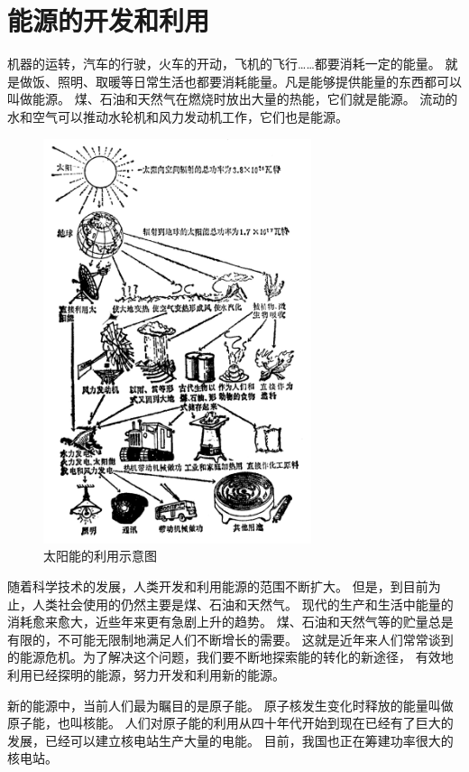 \section{能源的开发和利用}\label{sec:5-7}

机器的运转，汽车的行驶，火车的开动，飞机的飞行……都要消耗一定的能量。
就是做饭、照明、取暖等日常生活也都要消耗能量。凡是能够提供能量的东西都可以叫做能源。
煤、石油和天然气在燃烧时放出大量的热能，它们就是能源。
流动的水和空气可以推动水轮机和风力发动机工作，它们也是能源。

\begin{figure}[htbp]
    \centering
    \includegraphics[width=0.7\textwidth]{../pic/czwl2-ch5-7}
    \caption{太阳能的利用示意图}\label{fig:5-7}
\end{figure}

随着科学技术的发展，人类开发和利用能源的范围不断扩大。
但是，到目前为止，人类社会使用的仍然主要是煤、石油和天然气。
现代的生产和生活中能量的消耗愈来愈大，近些年来更有急剧上升的趋势。
煤、石油和天然气等的贮量总是有限的，不可能无限制地满足人们不断增长的需要。
这就是近年来人们常常谈到的能源危机。为了解决这个问题，我们要不断地探索能的转化的新途径，
有效地利用已经探明的能源，努力开发和利用新的能源。

新的能源中，当前人们最为瞩目的是原子能。
原子核发生变化时释放的能量叫做原子能，也叫核能。
人们对原子能的利用从四十年代开始到现在已经有了巨大的发展，已经可以建立核电站生产大量的电能。
目前，我国也正在筹建功率很大的核电站。

